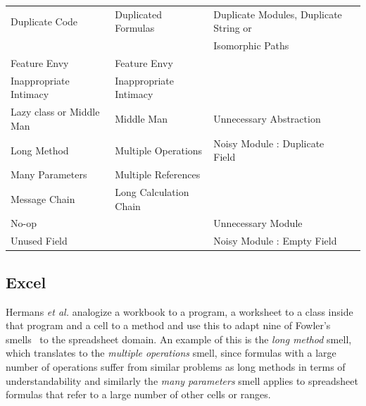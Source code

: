 \documentclass{sig-alternate}
\renewcommand*\cmidrule{\midrule[0.001em]} %
\begin{document}
\begin{table}
\begin{small}
\begin{center}
\begin{tabular} {@{}llll@{}}
\\ \cmidrule
Duplicate Code
	& Duplicated Formulas \cite{Hermans2012intra}
	& Duplicate Modules, Duplicate String or
\\ %
& 
& Isomorphic Paths \cite{StoleeTSE2013}
\\ \cmidrule
Feature Envy
	& Feature Envy \cite{Hermans2012inter}
	& %
\\ \cmidrule
Inappropriate Intimacy
	& Inappropriate Intimacy \cite{Hermans2012inter}
	& %
\\ \cmidrule
Lazy class or Middle Man
	& Middle Man \cite{Hermans2012inter}
	& Unnecessary Abstraction \cite{StoleeTSE2013}
\\ \cmidrule
Long Method
	& Multiple Operations \cite{Hermans2012intra}
	& Noisy Module : Duplicate Field \cite{StoleeTSE2013}
\\ \cmidrule
Many Parameters
	& Multiple References \cite{Hermans2012intra}
	& 
\\ \cmidrule
Message Chain
	& Long Calculation Chain \cite{Hermans2012intra}
	& 
\\ \cmidrule
No-op
	& %
	& Unnecessary Module \cite{StoleeTSE2013}
\\ \cmidrule
Unused Field
	& %
	& Noisy Module : Empty Field \cite{StoleeTSE2013}
\\ \bottomrule
\end{tabular}
\end{center}
\end{small}
\end{table}


 \subsection{Excel}
Hermans \emph{et al.} \cite{Hermans2012inter,Hermans2012intra} analogize a workbook to a program, a worksheet to a class inside that program and a cell to a method and use this to adapt nine of Fowler's smells~\cite{Fowl1999} to the spreadsheet domain.
An example of this is the \emph{long method} smell, which translates to the \emph{multiple operations} smell, since formulas with a large number of operations suffer from similar problems as long methods in terms of understandability and similarly the \emph{many parameters} smell applies to spreadsheet formulas that refer to a large number of other cells or ranges. 
\end{document}
